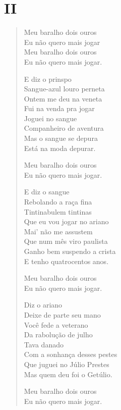 \pagebreak
\section{II}

\begin{verse}
\quad\quad\quad{}Meu baralho dois ouros\\
\quad\quad\quad{}Eu não quero mais jogar\\
\quad\quad\quad{}Meu baralho dois ouros\\
\quad\quad\quad{}Eu não quero mais jogar.

E diz o prinspo\\
Sangue-azul louro perneta\\
Ontem me deu na veneta\\
Fui na venda pra jogar\\
Joguei no sangue\\
Companheiro de aventura\\
Mas o sangue se depura\\
Está na moda depurar.

\quad\quad\quad{}Meu baralho dois ouros\\
\quad\quad\quad{}Eu não quero mais jogar.

E diz o sangue\\
Rebolando a raça fina\\
Tintinabulem tintinas\\
Que eu vou jogar no ariano\\
Mai' não me assustem\\
Que num mês viro paulista\\
Ganho bem suspendo a crista\\
E tenho quatrocentos anos.

\quad\quad\quad{}Meu baralho dois ouros\\
\quad\quad\quad{}Eu não quero mais jogar.

Diz o ariano\\
Deixe de parte seu mano\\
Você fede a veterano\\
Da rabolução de julho\\
Tava danado\\
Com a sonhança desses pestes\\
Que juguei no Júlio Prestes\\
Mas quem deu foi o Getúlio.

\quad\quad\quad{}Meu baralho dois ouros\\
\quad\quad\quad{}Eu não quero mais jogar.


\end{verse}
